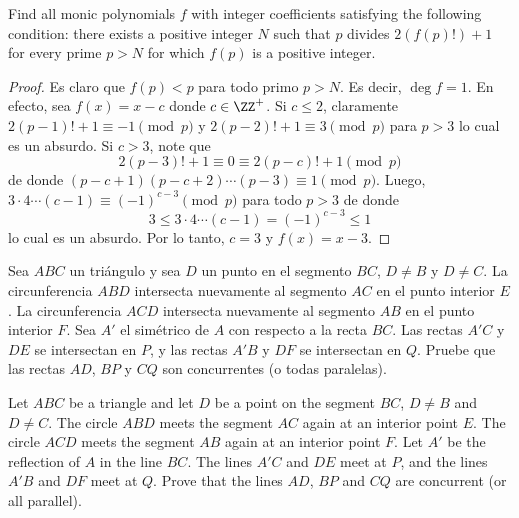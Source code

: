 \begin{probEG}[Balkan MO 2016/3]
  Find all monic polynomials $f$ with integer coefficients satisfying the
  following condition: there exists a positive integer $N$ such that $p$ divides
  $2(f(p)!)+1$ for every prime $p>N$ for which $f(p)$ is a positive integer.
\end{probEG}

\begin{proof}
  Es claro que $f(p)<p$ para todo primo $p>N$. Es decir, $\deg f=1$. En efecto,
  sea $f(x)=x-c$ donde $c\in\ZZ^+$. Si $c\le 2$, claramente
  $2(p-1)!+1\equiv -1\pmod p$ y $2(p-2)!+1\equiv 3\pmod p$ para $p>3$ lo cual es
  un absurdo. Si $c>3$, note que
  \[2(p-3)!+1\equiv 0\equiv 2(p-c)!+1\pmod p\]
  de donde $(p-c+1)(p-c+2)\cdots(p-3)\equiv 1\pmod p$. Luego,
  $3\cdot 4\cdots(c-1)\equiv(-1)^{c-3}\pmod p$ para todo $p>3$ de donde
  \[3\le 3\cdot 4\cdots(c-1)=(-1)^{c-3}\le 1\]
  lo cual es un absurdo. Por lo tanto, $c=3$ y $f(x)=x-3$.
\end{proof}


\begin{probEG}[RMM 2016/1]
  Sea $ABC$ un triángulo y sea $D$ un punto en el segmento $BC$, $D\ne B$ y
  $D\ne C$. La circunferencia $ABD$ intersecta nuevamente al segmento $AC$ en el
  punto interior $E$. La circunferencia $ACD$ intersecta nuevamente al segmento
  $AB$ en el punto interior $F$. Sea $A'$ el simétrico de $A$ con respecto a la
  recta $BC$. Las rectas $A'C$ y $DE$ se intersectan en $P$, y las rectas $A'B$
  y $DF$ se intersectan en $Q$. Pruebe que las rectas $AD$, $BP$ y $CQ$ son
  concurrentes (o todas paralelas).
  \begin{hint}
    Let $ABC$ be a triangle and let $D$ be a point on the segment $BC$, $D\ne B$
    and $D\ne C$. The circle $ABD$ meets the segment $AC$ again at an interior
    point $E$. The circle $ACD$ meets the segment $AB$ again at an interior
    point $F$. Let $A'$ be the reflection of $A$ in the line $BC$. The lines
    $A'C$ and $DE$ meet at $P$, and the lines $A'B$ and $DF$ meet at $Q$. Prove
    that the lines $AD$, $BP$ and $CQ$ are concurrent (or all parallel).
  \end{hint}
\end{probEG}

